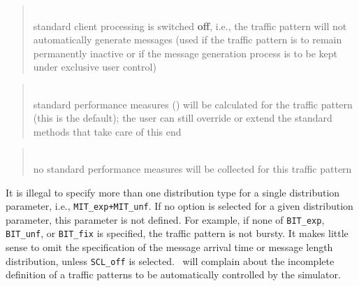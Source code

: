 \begin{quote}
\noindent{}\\ \hspace{0in}
standard client processing is switched {\bf off}, i.e., the traffic pattern
will not automatically generate messages
(used if the traffic pattern is to
remain permanently
inactive or if the message generation process is to be kept under exclusive
user control)
\end{quote}

\begin{quote}
\noindent{}\\ \hspace{0in}
standard performance measures
()
will be calculated for the traffic pattern (this is the default);
the user can still override or extend the standard methods that take care of
this end
\end{quote}

\begin{quote}
\noindent{}\\ \hspace{0in}
no standard performance measures will be collected for this traffic pattern
\end{quote}\medskip

It is illegal to specify more than one distribution type for a single
distribution parameter, i.e., {\tt MIT\_exp+MIT\_unf}.
If no option is selected for a given distribution parameter, this parameter
is not defined.
For example, if none of {\tt BIT\_exp}, {\tt BIT\_unf}, or
{\tt BIT\_fix} is specified, the traffic pattern is not bursty.
It makes little sense to omit the specification of the message arrival time
or message length distribution, unless {\tt SCL\_off} is selected.
\smurph\ will complain about the incomplete definition of a traffic patterns
to be automatically controlled by the simulator.

